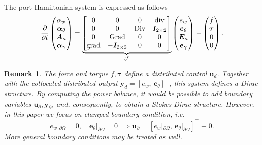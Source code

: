 \documentclass{ifacconf}
\newtheorem{remark}{Remark}
\begin{document}
The port-Hamiltonian system is expressed as follows 
\begin{equation}
\label{eq:PH_sys_Min_Ten}
\diffp{}{t}
\begin{pmatrix}
\alpha_w \\
\bm\alpha_\theta \\
\bm{A}_\kappa \\
\bm\alpha_{\gamma} \\
\end{pmatrix} = 
\underbrace{\begin{bmatrix}
	0  & 0  & 0  & \mathrm{div} \\
	0 & 0 &  \mathrm{Div} & \bm{I}_{2 \times 2}\\
	0  & \mathrm{Grad}  & 0  & 0\\
	\mathrm{grad} & -\bm{I}_{2 \times 2} &  0 & 0  \\
	\end{bmatrix}}_{\mathcal{J}}
\begin{pmatrix}
e_w \\
\bm{e}_{\theta} \\
\bm{E}_{\kappa} \\
\bm{e}_{\gamma} \\
\end{pmatrix} + 
\begin{pmatrix}
f \\
\bm{\tau} \\
0 \\
0 \\
\end{pmatrix}.
\end{equation}
\begin{remark}\label{rmk:stdir}
The force and torque $f, \bm{\tau}$ define a distributed control $\bm{u}_d$. Together with the collocated distributed output $\bm{y}_d=[e_w, \ \bm{e}_\theta]^\top$, this system defines a Dirac structure. By computing the power balance, it would be possible to add boundary variables $\bm{u}_\partial,  \bm{y}_\partial$, and, consequently, to obtain a Stokes-Dirac structure. However, in this paper we focus on clamped boundary condition, i.e.
\[
e_w|_{\partial \Omega} = 0, \quad \bm{e}_{\theta}|_{\partial \Omega} = 0 \implies \bm{u}_\partial = [e_w|_{\partial \Omega}, \ \bm{e}_\theta|_{\partial \Omega}]^\top \equiv 0.
\]
More general boundary conditions may be treated as well.
\end{remark}
\end{document}
